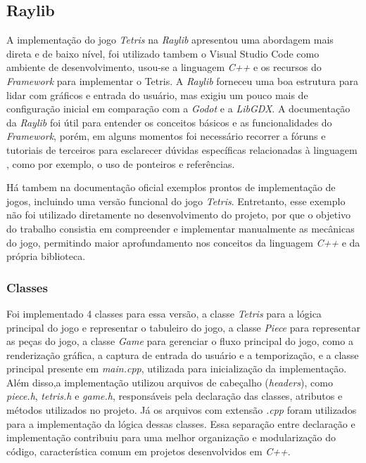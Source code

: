 \subsection{Raylib}

A implementação do jogo \textit{Tetris} na \textit{Raylib} apresentou uma abordagem mais direta e de baixo nível, foi utilizado tambem o Visual Studio Code como ambiente de desenvolvimento, usou-se a linguagem \textit{C++} e os recursos do \textit{Framework} para implementar o Tetris. A \textit{Raylib} forneceu uma boa estrutura para lidar com gráficos e entrada do usuário, mas exigiu um pouco mais de configuração inicial em comparação com a \textit{Godot} e a \textit{LibGDX}. A documentação da \textit{Raylib} foi útil para entender os conceitos básicos e as funcionalidades do \textit{Framework}, porém, em alguns momentos foi necessário recorrer a fóruns e tutoriais de terceiros para esclarecer dúvidas específicas relacionadas à linguagem , como por exemplo, o uso de ponteiros e referências.

Há tambem na documentação oficial exemplos prontos de implementação de jogos, incluindo uma versão funcional do jogo \textit{Tetris}. Entretanto, esse exemplo não foi utilizado diretamente no desenvolvimento do projeto, por que o objetivo do trabalho consistia em compreender e implementar manualmente as mecânicas do jogo, permitindo maior aprofundamento nos conceitos da linguagem \textit{C++} e da própria biblioteca.

\subsubsection{Classes}

Foi implementado 4 classes para essa versão, a classe \textit{Tetris} para a lógica principal do jogo e representar o tabuleiro do jogo, a classe \textit{Piece} para representar as peças do jogo, a classe \textit{Game} para gerenciar o fluxo principal do jogo, como a renderização gráfica, a captura de entrada do usuário e a temporização, e a classe principal presente em \textit{main.cpp}, utilizada para inicialização da implementação.
Além disso,a implementação utilizou arquivos de cabeçalho (\textit{headers}), como \textit{piece.h}, \textit{tetris.h} e \textit{game.h}, responsáveis pela declaração das classes, atributos e métodos utilizados no projeto. Já os arquivos com extensão \textit{.cpp} foram utilizados para a implementação da lógica dessas classes. Essa separação entre declaração e implementação contribuiu para uma melhor organização e modularização do código, característica comum em projetos desenvolvidos em \textit{C++}.

